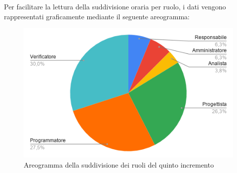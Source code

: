 \documentclass[../piano-di-progetto.tex]{subfiles}
\begin{document}
  Per facilitare la lettura della suddivisione oraria per ruolo, i dati vengono rappresentati graficamente mediante il seguente areogramma:
  \begin{figure}[H]
    \centering
    \includegraphics[width=12cm]{img/ruoli-5-incr.png}
    \caption{Areogramma della suddivisione dei ruoli del quinto incremento}
    \label{fig:ore-ruolo-progettazione}
  \end{figure}
\end{document}
